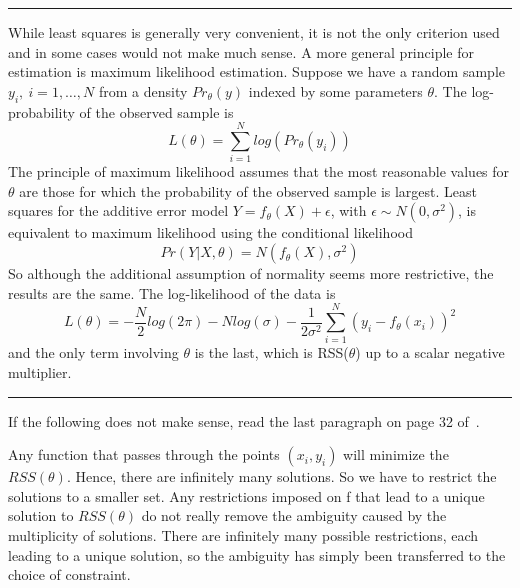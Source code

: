\hrule
\vspace{.1in}

While least squares is generally very convenient, it 
is not the only criterion used and in some cases would 
not make much sense. A more general principle for estimation is 
maximum likelihood estimation. Suppose we have a random 
sample $y_i, ~ i = 1, \dots , N$ from a density $Pr_{\theta}(y)$ 
indexed by some parameters $\theta$. The log-probability of the observed sample is
\begin{equation}
L(\theta) = \sum_{i=1}^N log(Pr_\theta(y_i))
\end{equation}
The principle of maximum likelihood assumes that the 
most reasonable values for $\theta$ are those for which 
the probability of the observed sample is largest. 
Least squares for the additive error model 
$Y = f_\theta(X) + \epsilon$, with $\epsilon \sim N(0,\sigma^2)$, is equivalent to 
maximum likelihood using the conditional likelihood
\begin{equation}
Pr(Y|X,\theta) = N(f_\theta(X), \sigma^2)
\end{equation}
So although the additional assumption of normality seems more restrictive,
the results are the same. The log-likelihood of the data is
\begin{equation}
L(\theta) = -\frac{N}{2} log(2\pi) - N log(\sigma) - \frac{1}{2\sigma^2} \sum_{i=1}^N (y_i - f_\theta(x_i))^2
\end{equation}
and the only term involving $\theta$ is the last, which is 
RSS($\theta$) up to a scalar negative multiplier.

\hrule
\vspace{.1in}
If the following does not make sense, read the
last paragraph on page 32 of~\citep{Hastie2001elements}.

Any function that passes through the points
$(x_i, y_i)$ will minimize the $RSS(\theta)$.
Hence, there are infinitely many solutions. So we have
to restrict the solutions to a smaller set.
Any restrictions imposed on f that lead to a unique 
solution to $RSS(\theta)$ do not really remove the ambiguity
caused by the multiplicity of solutions. There are infinitely 
many possible restrictions, each leading to a unique solution, 
so the ambiguity has simply been transferred to the choice of constraint.

